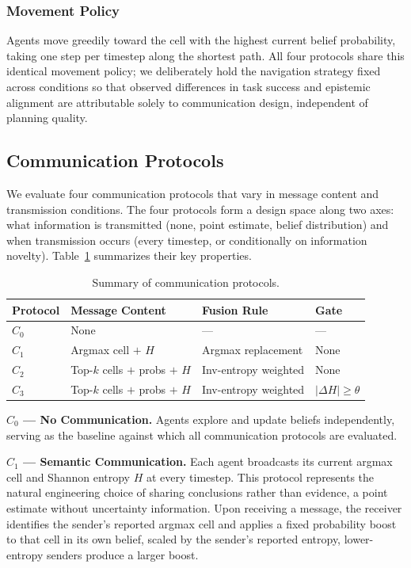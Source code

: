 \documentclass[pdflatex,sn-mathphys-num]{sn-jnl}%
\theoremstyle{thmstyleone}%
\theoremstyle{thmstyletwo}%
\theoremstyle{thmstylethree}%
\begin{document}
\subsubsection{Movement Policy}

Agents move greedily toward the cell with the highest current belief probability, taking one step per timestep along the shortest path. All four protocols share this identical movement policy; we deliberately hold the navigation strategy fixed across conditions so that observed differences in task success and epistemic alignment are attributable solely to communication design, independent of planning quality.

\subsection{Communication Protocols}
\label{sec:protocols}

We evaluate four communication protocols that vary in message content and transmission conditions. The four protocols form a design space along two axes: what information is transmitted (none, point estimate, belief distribution) and when transmission occurs (every timestep, or conditionally on information novelty). Table~\ref{tab:protocols} summarizes their key properties.

\begin{table}[h]
\centering
\caption{Summary of communication protocols.}
\label{tab:protocols}
\begin{tabular}{llll}
\toprule
Protocol & Message Content & Fusion Rule & Gate \\
\midrule
$C_0$ & None & --- & --- \\
$C_1$ & Argmax cell $+$ $H$  & Argmax replacement & None \\
$C_2$ & Top-$k$ cells $+$ probs $+$ $H$ &
        Inv-entropy weighted & None \\
$C_3$ & Top-$k$ cells $+$ probs $+$ $H$  &
        Inv-entropy weighted & $|\Delta H| \geq \theta$ \\
\bottomrule
\end{tabular}
\end{table}

\textbf{$C_0$ --- No Communication.} Agents explore and update beliefs
independently, serving as the baseline against which all communication
protocols are evaluated.

\textbf{$C_1$ --- Semantic Communication.} Each agent broadcasts its
current argmax cell and Shannon entropy $H$ at every timestep. This
protocol represents the natural engineering choice of sharing
conclusions rather than evidence, a point estimate without
uncertainty information. Upon receiving a message, the receiver identifies the sender's reported argmax cell and applies a fixed probability boost to that cell in its own belief, scaled by the sender's reported entropy, lower-entropy senders produce a larger boost.
\end{document}

